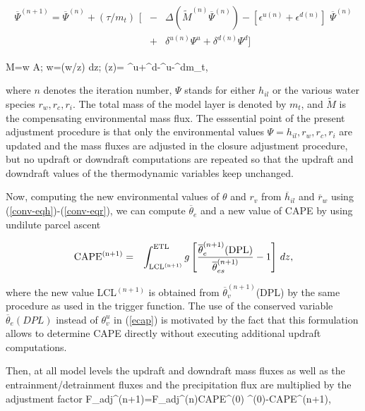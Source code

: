 \begin{eqnarray}
\overline{\Psi}^{(n+1)}=\overline{\Psi}^{(n)}+(\tau/m_t)\,\,
\bigg[&-&\Delta( \tilde M^{(n)}\overline{\Psi}^{(n)})-
[\epsilon^{u(n)}+\epsilon^{d(n)}]\,\,
\overline{\Psi}^{(n)}\nonumber\\
&+&\delta^{u(n)}\Psi^{u}+\delta^{d(n)}\Psi^{d}\bigg]
\label{eqTa}
\end{eqnarray}


\beq
\tilde M=\overline{\rho}\tilde w A;\quad
\tilde w=\int(\partial\tilde w/\partial z) dz;\quad
\left({\partial{}\over\partial z}\right)=
{\epsilon^u+\epsilon^d-\delta^u-\delta^d\over m_t},
\label{eqTb}
\eeq


\noindent
where $n$ denotes the iteration number,
$\Psi$ stands for either $h_{il}$ or the various water species  $r_w, r_c, r_i$.
The total mass of the model layer is denoted by $m_t$,
 and  $\tilde M$  is the compensating environmental mass flux.
The esssential point of the present adjustment procedure is that only
the environmental values  $\Psi= h_{il}, r_w, r_c, r_i$ are updated
and  the mass fluxes are adjusted
in the closure adjustment procedure, but no updraft or
downdraft computations are repeated so that the updraft and downdraft values
of the thermodynamic variables keep unchanged.

Now, computing the new environmental values of $\theta$ and $r_v$ from
$\overline{h}_{il}$ and $\overline{r}_w$
using (\ref{conv-eqh})-(\ref{conv-eqr}),
we can compute $\overline{\theta}_e$ and a new value of
CAPE  by using undilute parcel ascent

\begin{eqnarray}
{\rm CAPE^{(n+1)}}&=&
\int^{\rm ETL}_{\rm LCL^{(n+1)}} g
\left[ {
\overline\theta_e^{(n+1)}({\rm DPL})
\over\overline{\theta}_{es}^{(n+1)}  } -1 \right]\, dz,
\label{ecap}
\end{eqnarray}

\noindent
where the new value LCL$^{(n+1)}$ is obtained from
$\overline{\theta}_v^{(n+1)}$(DPL) by
the same procedure as used in the trigger function. The use of the
conserved variable $\overline{\theta}_{e}(DPL)$ instead of $\theta_v^u$
in (\ref{ecap}) is motivated by the fact that this formulation allows to
determine CAPE directly without executing additional updraft computations.

Then, at all model levels the updraft and downdraft mass fluxes as well as
the entrainment/detrainment fluxes and the precipitation flux
are multiplied by the adjustment factor
\beq
F_{adj}^{(n+1)}=F_{adj}^{(n)}{{\rm CAPE}^{(0)}
^{(0)}-{\rm CAPE}^{(n+1)}},
\label{eqFa}
\eeq

